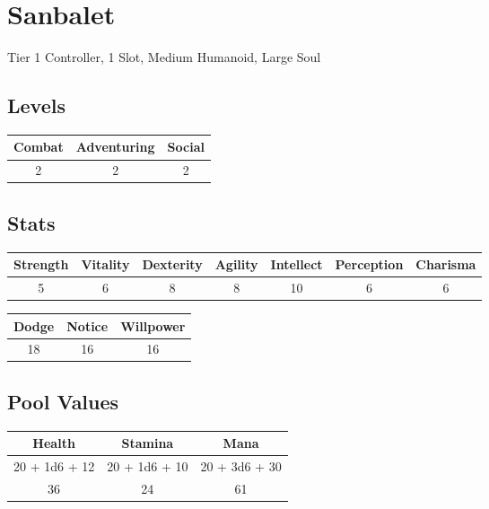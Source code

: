 \section{Sanbalet}\label{creature:sanbalet}
Tier 1 Controller, 1 Slot, Medium Humanoid, Large Soul\\

\subsection{Levels}
\begin{minipage}[H]{1\textwidth}
	\centering
	\begin{tabular}[c]{|c | c | c|}
		\hline
		Combat & Adventuring & Social\\
		\hline
		2 & 2 & 2\\
		\hline
	\end{tabular}
\end{minipage}

\subsection{Stats}
\begin{minipage}[H]{1\textwidth}
	\centering
	\begin{tabular}[c]{|c | c | c | c | c | c | c|}
		\hline
		Strength & Vitality & Dexterity & Agility & Intellect & Perception & Charisma\\
		\hline
		5 & 6 & 8 & 8 & 10 & 6 & 6\\
		\hline
	\end{tabular}
\end{minipage}

\begin{minipage}[H]{1\textwidth}
	\centering
	\begin{tabular}[c]{|c | c | c|}
		\hline
		Dodge & Notice & Willpower\\
		\hline
		18 & 16 & 16\\
		\hline
	\end{tabular}
\end{minipage}

\subsection{Pool Values}
\begin{minipage}[H]{1\textwidth}
	\centering
	\begin{tabular}[c]{|c | c | c|}
		\hline
		Health & Stamina & Mana\\
		\hline
		20 + 1d6 + 12 & 20 + 1d6 + 10 & 20 + 3d6 + 30 \\
		36 & 24 & 61\\
		\hline
	\end{tabular}
\end{minipage}

